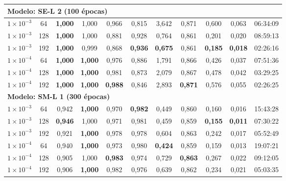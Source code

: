 \begin{longtable}{cc ccccccccc}
\multicolumn{11}{l}{\textbf{Modelo: SE-L 2 (100 épocas)}} \\
\midrule
$1 \times 10^{-3}$ & 64  & \textbf{1,000} & 1,000 & 0,966 & 0,815 & 3,642 & 0,871 & 0,600 & 0,063 & 06:34:09 \\
$1 \times 10^{-3}$ & 128 & \textbf{1,000} & 1,000 & 0,881 & 0,928 & 0,764 & 0,861 & 0,201 & 0,020 & 08:59:13 \\
$1 \times 10^{-3}$ & 192 & \textbf{1,000} & 0,999 & 0,868 & \textbf{0,936} & \textbf{0,675} & 0,861 & \textbf{0,185} & \textbf{0,018} & 02:26:16 \\
$1 \times 10^{-4}$ & 64  & \textbf{1,000} & \textbf{1,000} & 0,976 & 0,886 & 1,791 & 0,866 & 0,426 & 0,037 & 07:51:36 \\
$1 \times 10^{-4}$ & 128 & \textbf{1,000} & \textbf{1,000} & 0,981 & 0,873 & 2,079 & 0,867 & 0,478 & 0,042 & 03:29:25 \\
$1 \times 10^{-4}$ & 192 & \textbf{1,000} & \textbf{1,000} & \textbf{0,988} & 0,846 & 2,893 & \textbf{0,871} & 0,576 & 0,055 & 02:26:25 \\
\midrule

\multicolumn{11}{l}{\textbf{Modelo: SM-L 1 (300 épocas)}} \\
\midrule
$1 \times 10^{-3}$ & 64  & 0,942 & \textbf{1,000} & 0,970 & \textbf{0,982} & 0,449 & 0,860 & 0,160 & 0,016 & 15:43:28 \\
$1 \times 10^{-3}$ & 128 & \textbf{0,946} & 1,000 & 0,971 & 0,981 & 0,459 & 0,859 & \textbf{0,155} & \textbf{0,011} & 07:30:22 \\
$1 \times 10^{-3}$ & 192 & 0,921 & \textbf{1,000} & 0,978 & 0,978 & 0,604 & 0,863 & 0,242 & 0,017 & 05:52:49 \\
$1 \times 10^{-4}$ & 64  & 0,940 & \textbf{1,000} & 0,973 & 0,980 & \textbf{0,424} & 0,859 & 0,159 & 0,013 & 19:07:21 \\
$1 \times 10^{-4}$ & 128 & 0,905 & 1,000 & \textbf{0,983} & 0,974 & 0,729 & \textbf{0,863} & 0,267 & 0,022 & 09:12:05 \\
$1 \times 10^{-4}$ & 192 & 0,906 & \textbf{1,000} & 0,982 & 0,976 & 0,639 & 0,862 & 0,234 & 0,021 & 05:03:35 \\
\midrule


\end{longtable}
